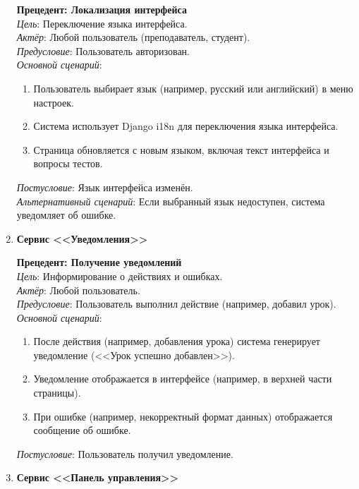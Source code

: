 \begin{enumerate}
	\textbf{Прецедент: Локализация интерфейса} \\
	\textit{Цель}: Переключение языка интерфейса. \\
	\textit{Актёр}: Любой пользователь (преподаватель, студент). \\
	\textit{Предусловие}: Пользователь авторизован. \\
	\textit{Основной сценарий}:
	\begin{enumerate}
		\item Пользователь выбирает язык (например, русский или английский) в меню настроек.
		\item Система использует Django i18n для переключения языка интерфейса.
		\item Страница обновляется с новым языком, включая текст интерфейса и вопросы тестов.
	\end{enumerate}
	\textit{Постусловие}: Язык интерфейса изменён. \\
	\textit{Альтернативный сценарий}: Если выбранный язык недоступен, система уведомляет об ошибке.
	
	\item \textbf{Сервис <<Уведомления>>}
	
	\textbf{Прецедент: Получение уведомлений} \\
	\textit{Цель}: Информирование о действиях и ошибках. \\
	\textit{Актёр}: Любой пользователь. \\
	\textit{Предусловие}: Пользователь выполнил действие (например, добавил урок). \\
	\textit{Основной сценарий}:
	\begin{enumerate}
		\item После действия (например, добавления урока) система генерирует уведомление (<<Урок успешно добавлен>>).
		\item Уведомление отображается в интерфейсе (например, в верхней части страницы).
		\item При ошибке (например, некорректный формат данных) отображается сообщение об ошибке.
	\end{enumerate}
	\textit{Постусловие}: Пользователь получил уведомление.
	
	\item \textbf{Сервис <<Панель управления>>}
	

\end{enumerate}
